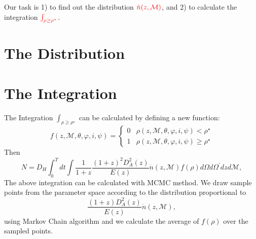 \documentclass{article}
\begin{document}
Our task is 1) to find out the distribution $\textcolor{red}{\dot{n}(z,\mathcal{M})}$, and 2) to calculate the integration $\textcolor{red}{\int_{\rho\ge\rho^\star}}$. 
\section{The Distribution}
\section{The Integration}
The Integration $\int_{\rho\ge\rho^\star}$ can be calculated by defining a new function:
\begin{equation}
f(z,\mathcal{M},\theta,\varphi,i,\psi)=
    \begin{cases} 
      0 & \rho(z,\mathcal{M},\theta,\varphi,i,\psi)<\rho^\star \\
      1 & \rho(z,\mathcal{M},\theta,\varphi,i,\psi)\ge\rho^\star
    \end{cases}
\end{equation}
Then
\begin{equation}
    N=D_H\int^T_0dt\int\frac{1}{1+z}\frac{(1+z)^2D^2_A(z)}{E(z)}\dot{n}(z,\mathcal{M})f(\rho)d\Omega d\Omega^\prime dzd\mathcal{M},
\end{equation}
The above integration can be calculated with MCMC method. We draw sample points from the parameter space according to the distribution proportional to 
\begin{equation}
    \frac{(1+z)D^2_A(z)}{E(z)}\dot{n}(z,\mathcal{M}),
\end{equation}
using Markov Chain algorithm and we calculate the average of $f(\rho)$ over the sampled points. 
\end{document}
